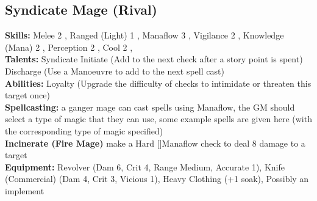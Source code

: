 \documentclass{article}
\newcommand\Hard{Hard [\Purple[3]]}
\begin{document}
\begin{multicols}{2}
{\subsection{Syndicate Mage (Rival)}
\begin{center}
\end{center}
\textbf{Skills:} 
Melee 2 \Yellow[2],
Ranged (Light) 1 \Yellow[1]\Green[1],
Manaflow 3 \Yellow[3]\Green[1],
Vigilance 2 \Yellow[2]\Green[2],
Knowledge (Mana) 2 \Yellow[2],
Perception 2 \Yellow[2],
Cool 2 \Yellow[2],
\\\textbf{Talents:} Syndicate Initiate (Add \Blue[2] to the next check after a story point is spent)
Discharge (Use a Manoeuvre to add \Advantage\Advantage to the next spell cast)
\\\textbf{Abilities:} Loyalty (Upgrade the difficulty of checks to intimidate or threaten this target once)
\\\textbf{Spellcasting:} a ganger mage can cast spells using Manaflow, the GM should select a type of magic that they can use, some example spells are given here (with the corresponding type of magic specified)
\\\textbf{Incinerate (Fire Mage)} make a \Hard Manaflow check to deal 8 damage to a target
\\\textbf{Equipment:} Revolver (Dam 6, Crit 4, Range Medium, Accurate 1), Knife (Commercial) (Dam 4, Crit 3, Vicious 1), Heavy Clothing (+1 soak), Possibly an implement
}

\vbox{
}
\end{multicols}
\end{document}

